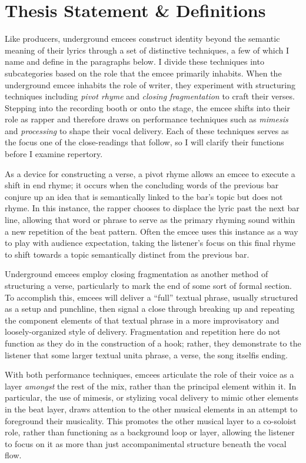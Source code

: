 \section{Thesis Statement \& Definitions}
Like producers, underground emcees construct identity beyond the semantic meaning of their lyrics
through a set of distinctive techniques, a few of which I name and define in the paragraphs below. 
I divide these techniques into subcategories based on the role that the emcee primarily inhabits. 
When the underground emcee inhabits the role of writer, they experiment with structuring techniques 
including  \emph{pivot rhyme} and \emph{closing fragmentation} to craft their verses. Stepping into 
the recording booth or onto the stage, the emcee shifts into their role as rapper and therefore 
draws on performance techniques such as \emph{mimesis} and \emph{processing} to shape their vocal delivery. 
Each of these techniques serves as the focus one of the close-readings that follow, so I will clarify
their functions before I examine repertory.

As a device for constructing a verse, a pivot rhyme allows an emcee to execute a shift in end rhyme;
it occurs when the concluding words of the previous bar conjure up an idea that is semantically linked 
to the bar's topic but does not rhyme. In this instance, the rapper chooses to displace the lyric past
the next bar line, allowing that word or phrase to serve as the primary rhyming sound within a new repetition
of the beat pattern. Often the emcee uses this instance as a way to play with audience expectation, taking
the listener's focus on this final rhyme to shift towards a topic semantically distinct from the previous bar.

Underground emcees employ closing fragmentation as another method of structuring a verse, particularly
to mark the end of some sort of formal section. To accomplish this, emcees will deliver a ``full'' textual
phrase, usually structured as a setup and punchline, then signal a close through breaking up and repeating 
the component elements of that textual phrase in a more improvisatory and loosely-organized style of delivery.
Fragmentation and repetition here do not function as they do in the construction of a hook; rather, they
demonstrate to the listener that some larger textual unit\textemdash a phrase, a verse, the song 
itself\textemdash is ending.

With both performance techniques, emcees articulate the role of their voice as a layer \emph{amongst} the rest 
of the mix, rather than the principal element within it. In particular, the use of mimesis, or stylizing vocal 
delivery to mimic other elements in the beat layer, draws attention to the other musical elements in an attempt
to foreground their musicality. This promotes the other musical layer to a co-soloist role, rather than 
functioning as a background loop or layer, allowing the listener to focus on it as more than just accompanimental
structure beneath the vocal flow.

